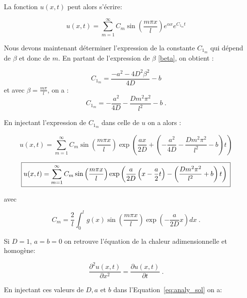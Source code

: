 \documentclass[a4paper, 12pt]{report}
\begin{document}
La fonction $u(x,t)$ peut alors s'écrire:

\begin{equation}
u(x,t) = \sum_{m=1}^{\infty} C_m \sin \left (\frac{m \pi x}{l} \right ) e^{\alpha x} e^{C_{1_m} t}
\end{equation}

Nous devons maintenant déterminer l'expression de la constante $C_{1_m}$ qui dépend de $\beta$ et donc de $m$. En partant de l'expression de $\beta$ \eqref{beta}, on obtient :

\begin{equation}
  C_{1_m}= \frac{-a^2 - 4D^{2}\beta^{2}}{4D}-b
\end{equation}
et avec $\beta = \frac{m \pi}{l}$, on a :
\begin{equation}
  C_{1_m}= - \frac{a^2}{4D} - \frac{D m^2 \pi^2}{l^2}-b\;.
\end{equation}

En injectant l'expression de $C_{1_m}$ dans celle de $u$ on a alors :

\begin{equation}
u(x,t) = \sum_{m=1}^{\infty} C_m \sin \left (\frac{m \pi x}{l} \right ) \exp \left ( \frac{a x}{2D} + \left ( - \frac{a^2}{4D} - \frac{D m^2 \pi^2}{l^2}-b \right ) t \right )
\end{equation}

\begin{equation}
  \boxed{u(x,t) = \sum_{m=1}^{\infty} C_m \sin \left (\frac{m \pi x}{l} \right ) \exp \left ( \frac{a}{2D} \left (x - \frac{a}{2} t \right ) - \left (\frac{D m^2 \pi^2}{l^2}+b \right ) t \right )\\
}
\label{eq:analy_sol}
\end{equation}

avec

\begin{equation}
  \boxed{C_m = \frac{2}{l} \int_0^l g(x) \sin \left (\frac{m \pi x}{l} \right ) \exp \left ( -\frac{a}{2D} x \right ) dx}\;.
\end{equation}

Si $D=1$, $a=b=0$ on retrouve l'équation de la chaleur adimensionnelle et homogène:

\begin{equation}
  \frac{\partial^2 u(x,t)}{\partial x^2} = \frac{\partial u(x,t)}{\partial t}\;.
\end{equation}

En injectant ces valeurs de $D,a$ et $b$ dans l'Equation~\ref{eq:analy_sol} on a:
\end{document}
